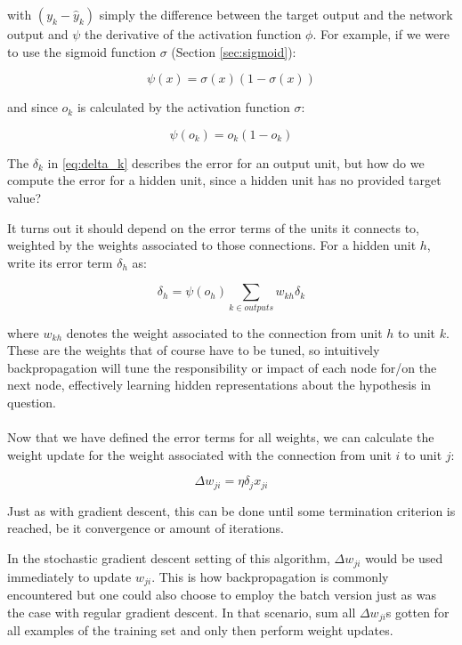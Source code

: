 with $(y_k - \hat{y}_k)$
simply the difference between the target output and the network output
and $\psi$ the derivative of the activation function $\phi$.
For example, if we were to use
the sigmoid function $\sigma$ (Section \ref{sec:sigmoid}):

\begin{equation}
  \psi(x) = \sigma(x) (1 - \sigma(x))
\end{equation}

and since $o_k$ is calculated by the activation function $\sigma$:

\begin{equation}
  \psi(o_k) = o_k (1 - o_k)
\end{equation}

The $\delta_k$ in \ref{eq:delta_k}
describes the error for an output unit,
but how do we compute the error for a hidden unit,
since a hidden unit has no provided target value?

It turns out it should depend on the error terms
of the units it connects to,
weighted by the weights associated to those connections.
For a hidden unit $h$, write its error term $\delta_h$ as:

\begin{equation}
  \delta_h = \psi(o_h) \sum_{k \in outputs} w_{kh}\delta_k
\end{equation}

where $w_{kh}$ denotes the weight associated to
the connection from unit $h$ to unit $k$.
These are the weights that of course have to be tuned,
so intuitively backpropagation will tune
the responsibility or impact of each node for/on the next node,
effectively learning hidden representations about the hypothesis in question.

\paragraph{}
Now that we have defined the error terms for all weights,
we can calculate the weight update
for the weight associated with the connection
from unit $i$ to unit $j$:

\begin{equation}
  \Delta w_{ji} = \eta \delta_j x_{ji}
\end{equation}

Just as with gradient descent,
this can be done until some termination criterion is reached,
be it convergence or amount of iterations.

In the stochastic gradient descent setting of this algorithm,
$\Delta w_{ji}$ would be used immediately to update
$w_{ji}$.
This is how backpropagation is commonly encountered
but one could also choose to employ the batch version
just as was the case with regular gradient descent.
In that scenario,
sum all $\Delta w_{ji}$s
gotten for all examples of the training set
and only then perform weight updates.

